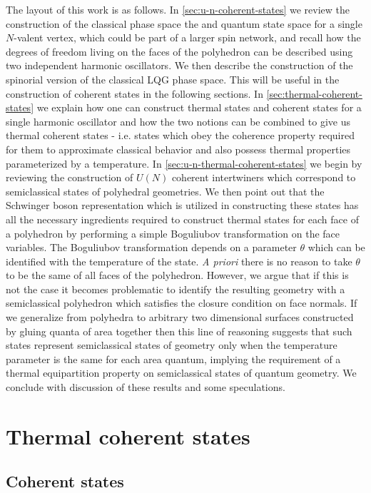 \documentclass[twocolumn,draft,aps,nofootinbib,nobibnotes,final]{revtex4-2}
\begin{document}
The layout of this work is as follows. In \autoref{sec:u-n-coherent-states} we review the construction of the classical phase space the and quantum state space for a single $ N $-valent vertex, which could be part of a larger spin network, and recall how the degrees of freedom living on the faces of the polyhedron can be described using two independent harmonic oscillators. We then describe the construction of the spinorial version of the classical LQG phase space. This will be useful in the construction of coherent states in the following sections. In \autoref{sec:thermal-coherent-states} we explain how one can construct thermal states and coherent states for a single harmonic oscillator and how the two notions can be combined to give us thermal coherent states - i.e. states which obey the coherence property required for them to approximate classical behavior and also possess thermal properties parameterized by a temperature. In \autoref{sec:u-n-thermal-coherent-states} we begin by reviewing the construction of $ U(N) $ coherent intertwiners which correspond to semiclassical states of polyhedral geometries. We then point out that the Schwinger boson representation which is utilized in constructing these states has all the necessary ingredients required to construct thermal states for each face of a polyhedron by performing a simple Boguliubov transformation on the face variables. The Boguliubov transformation depends on a parameter $ \theta $ which can be identified with the temperature of the state. \textit{A priori} there is no reason to take $ \theta $ to be the same of all faces of the polyhedron. However, we argue that if this is not the case it becomes problematic to identify the resulting geometry with a semiclassical polyhedron which satisfies the closure condition on face normals. If we generalize from polyhedra to arbitrary two dimensional surfaces constructed by gluing quanta of area together then this line of reasoning suggests that such states represent semiclassical states of geometry only when the temperature parameter is the same for each area quantum, implying the requirement of a thermal equipartition property on semiclassical states of quantum geometry. We conclude with discussion of these results and some speculations.

\section{Thermal coherent states}\label{sec:thermal-coherent-states}

\subsection{Coherent states}\label{sec:coherent-states}
\end{document}
